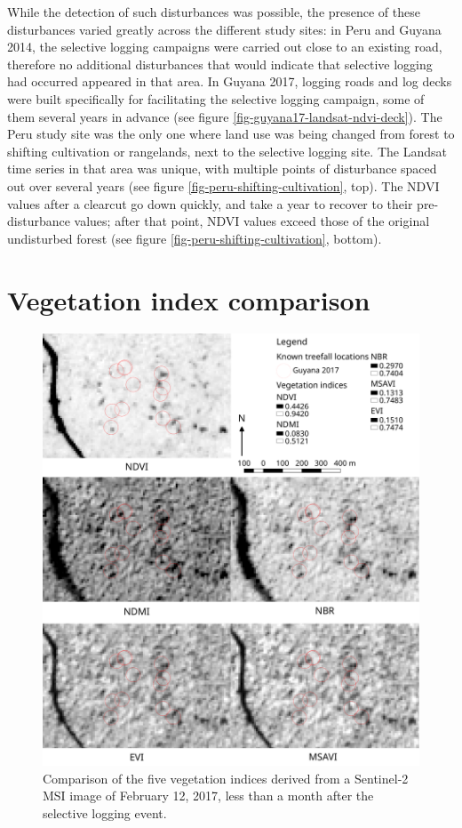 \documentclass[a4paper,12pt]{scrbook}
\begin{document}
While the detection of such disturbances was possible, the presence of these disturbances varied greatly across the different study sites: in Peru and Guyana 2014, the selective logging campaigns were carried out close to an existing road, therefore no additional disturbances that would indicate that selective logging had occurred appeared in that area. In Guyana 2017, logging roads and log decks were built specifically for facilitating the selective logging campaign, some of them several years in advance (see figure \ref{fig-guyana17-landsat-ndvi-deck}). The Peru study site was the only one where land use was being changed from forest to shifting cultivation or rangelands, next to the selective logging site. The Landsat time series in that area was unique, with multiple points of disturbance spaced out over several years (see figure \ref{fig-peru-shifting-cultivation}, top). The \ac{NDVI} values after a clearcut go down quickly, and take a year to recover to their pre-disturbance values; after that point, \ac{NDVI} values exceed those of the original undisturbed forest (see figure \ref{fig-peru-shifting-cultivation}, bottom).

\section{Vegetation index comparison}

\begin{figure}
  \centering
  \includegraphics[width=\textwidth]{thesis-figures/19-guyana17-vis}
  \caption{Comparison of the five vegetation indices derived from a Sentinel-2 \ac{MSI} image of February 12, 2017, less than a month after the selective logging event.}
  \label{fig-guyana17-vi}
\end{figure}
\end{document}
